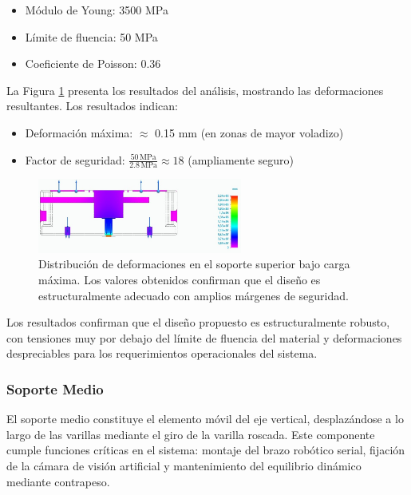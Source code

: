 \begin{itemize}
    \item Módulo de Young: 3500 MPa
    \item Límite de fluencia: 50 MPa
    \item Coeficiente de Poisson: 0.36
\end{itemize}

La Figura \ref{fig:SuperiorReal_simplificado_tensiones} presenta los resultados del análisis, mostrando las deformaciones resultantes. Los resultados indican:

\begin{itemize}
    \item Deformación máxima: $\approx$ 0.15 mm (en zonas de mayor voladizo)
    \item Factor de seguridad: $\frac{50\,\text{MPa}}{2.8\,\text{MPa}} \approx 18$ (ampliamente seguro)
\end{itemize}

\begin{figure}[H]
    \centering
    \includegraphics[width=0.6\textwidth]{img/SuperiorReal_simplificado_tensiones.jpg}
    \caption{Distribución de deformaciones en el soporte superior bajo carga máxima. Los valores obtenidos confirman que el diseño es estructuralmente adecuado con amplios márgenes de seguridad.}
    \label{fig:SuperiorReal_simplificado_tensiones}
\end{figure}

Los resultados confirman que el diseño propuesto es estructuralmente robusto, con tensiones muy por debajo del límite de fluencia del material y deformaciones despreciables para los requerimientos operacionales del sistema.

\subsubsection{Soporte Medio}

El soporte medio constituye el elemento móvil del eje vertical, desplazándose a lo largo de las varillas mediante el giro de la varilla roscada. Este componente cumple funciones críticas en el sistema: montaje del brazo robótico serial, fijación de la cámara de visión artificial y mantenimiento del equilibrio dinámico mediante contrapeso.

